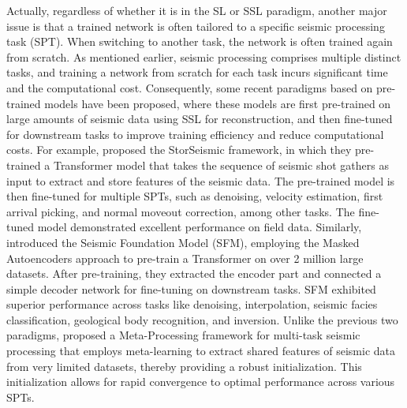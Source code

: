 Actually, regardless of whether it is in the SL or SSL paradigm, another major issue is that a trained network is often tailored to a specific seismic processing task (SPT). When switching to another task, the network is often trained again from scratch. As mentioned earlier, seismic processing comprises multiple distinct tasks, and training a network from scratch for each task incurs significant time and the computational cost. Consequently, some recent paradigms based on pre-trained models have been proposed, where these models are first pre-trained on large amounts of seismic data using SSL for reconstruction, and then fine-tuned for downstream tasks to improve training efficiency and reduce computational costs. For example, \cite{harsuko2022storseismic} proposed the StorSeismic framework, in which they pre-trained a Transformer model that takes the sequence of seismic shot gathers as input to extract and store features of the seismic data. The pre-trained model is then fine-tuned for multiple SPTs, such as denoising, velocity estimation, first arrival picking, and normal moveout correction, among other tasks. The fine-tuned model demonstrated excellent performance on field data. Similarly, \cite{sheng2023seismic} introduced the Seismic Foundation Model (SFM), employing the Masked Autoencoders approach to pre-train a Transformer on over 2 million large datasets. After pre-training, they extracted the encoder part and connected a simple decoder network for fine-tuning on downstream tasks. SFM exhibited superior performance across tasks like denoising, interpolation, seismic facies classification, geological body recognition, and inversion. Unlike the previous two paradigms, \cite{cheng2024meta} proposed a Meta-Processing framework for multi-task seismic processing that employs meta-learning to extract shared features of seismic data from very limited datasets, thereby providing a robust initialization. This initialization allows for rapid convergence to optimal performance across various SPTs. 

